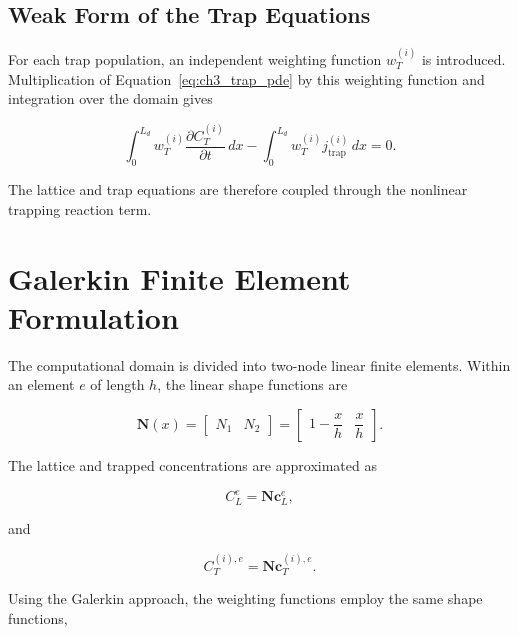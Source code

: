 \documentclass[a4paper,12pt,oneside]{report}
\begin{document}
\subsection{Weak Form of the Trap Equations}

For each trap population, an independent weighting function
$w_T^{(i)}$ is introduced. Multiplication of
Equation~\eqref{eq:ch3_trap_pde} by this weighting function and
integration over the domain gives

\begin{equation}
\int_0^{L_d}
w_T^{(i)}
\frac{\partial C_T^{(i)}}{\partial t}\,dx
-
\int_0^{L_d}
w_T^{(i)}
j_{\mathrm{trap}}^{(i)}\,dx
=0.
\label{eq:ch3_weak_trap}
\end{equation}

The lattice and trap equations are therefore coupled through the
nonlinear trapping reaction term.

\section{Galerkin Finite Element Formulation}
\label{sec:ch3_galerkin}

The computational domain is divided into two-node linear finite
elements. Within an element $e$ of length $h$, the linear shape
functions are

\begin{equation}
\mathbf{N}(x)
=
\begin{bmatrix}
N_1 & N_2
\end{bmatrix}
=
\begin{bmatrix}
1-\dfrac{x}{h} &
\dfrac{x}{h}
\end{bmatrix}.
\label{eq:ch3_shape}
\end{equation}

The lattice and trapped concentrations are approximated as

\begin{equation}
C_L^e
=
\mathbf{N}\mathbf{c}_L^e,
\end{equation}

and

\begin{equation}
C_T^{(i),e}
=
\mathbf{N}\mathbf{c}_T^{(i),e}.
\end{equation}

Using the Galerkin approach, the weighting functions employ the same
shape functions,
\end{document}
